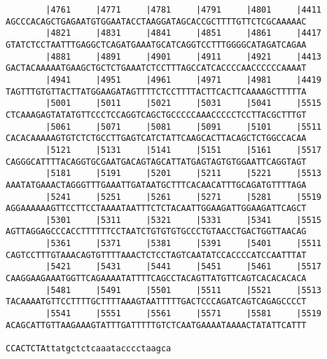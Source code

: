 \documentclass{article}
\begin{document}
\begin{Verbatim}
        |4761     |4771     |4781     |4791     |4801     |4411
AGCCCACAGCTGAGAATGTGGAATACCTAAGGATAGCACCGCTTTTGTTCTCGCAAAAAC
        |4821     |4831     |4841     |4851     |4861     |4417
GTATCTCCTAATTTGAGGCTCAGATGAAATGCATCAGGTCCTTTGGGGCATAGATCAGAA
        |4881     |4891     |4901     |4911     |4921     |4413
GACTACAAAAATGAAGCTGCTCTGAAATCTCCTTTAGCCATCACCCCAACCCCCCAAAAT
        |4941     |4951     |4961     |4971     |4981     |4419
TAGTTTGTGTTACTTATGGAAGATAGTTTTCTCCTTTTACTTCACTTCAAAAGCTTTTTA
        |5001     |5011     |5021     |5031     |5041     |5515
CTCAAAGAGTATATGTTCCCTCCAGGTCAGCTGCCCCCAAACCCCCTCCTTACGCTTTGT
        |5061     |5071     |5081     |5091     |5101     |5511
CACACAAAAAGTGTCTCTGCCTTGAGTCATCTATTCAAGCACTTACAGCTCTGGCCACAA
        |5121     |5131     |5141     |5151     |5161     |5517
CAGGGCATTTTACAGGTGCGAATGACAGTAGCATTATGAGTAGTGTGGAATTCAGGTAGT
        |5181     |5191     |5201     |5211     |5221     |5513
AAATATGAAACTAGGGTTTGAAATTGATAATGCTTTCACAACATTTGCAGATGTTTTAGA
        |5241     |5251     |5261     |5271     |5281     |5519
AGGAAAAAAGTTCCTTCCTAAAATAATTTCTCTACAATTGGAAGATTGGAAGATTCAGCT
        |5301     |5311     |5321     |5331     |5341     |5515
AGTTAGGAGCCCACCTTTTTTCCTAATCTGTGTGTGCCCTGTAACCTGACTGGTTAACAG
        |5361     |5371     |5381     |5391     |5401     |5511
CAGTCCTTTGTAAACAGTGTTTTAAACTCTCCTAGTCAATATCCACCCCATCCAATTTAT
        |5421     |5431     |5441     |5451     |5461     |5517
CAAGGAAGAAATGGTTCAGAAAATATTTTCAGCCTACAGTTATGTTCAGTCACACACACA
        |5481     |5491     |5501     |5511     |5521     |5513
TACAAAATGTTCCTTTTGCTTTTAAAGTAATTTTTGACTCCCAGATCAGTCAGAGCCCCT
        |5541     |5551     |5561     |5571     |5581     |5519
ACAGCATTGTTAAGAAAGTATTTGATTTTTGTCTCAATGAAAATAAAACTATATTCATTT
                                 
CCACTCTAttatgctctcaaatacccctaagca
\end{Verbatim}
\end{document}
